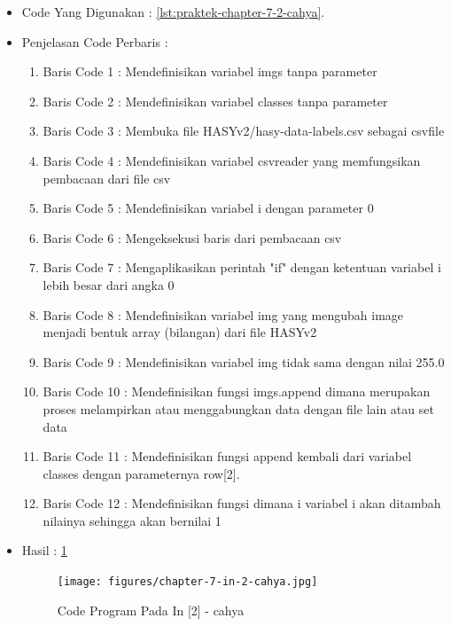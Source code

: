 \begin{enumerate}
\begin{itemize}
\item Code Yang Digunakan : \ref{lst:praktek-chapter-7-2-cahya}.

\par
\par
\item Penjelasan Code Perbaris	: 
\begin{enumerate}
\item Baris Code 1	: Mendefinisikan variabel imgs tanpa parameter
\item Baris Code 2	: Mendefinisikan variabel classes tanpa parameter
\item Baris Code 3	: Membuka file HASYv2/hasy-data-labels.csv sebagai csvfile
\item Baris Code 4	: Mendefinisikan variabel csvreader yang memfungsikan pembacaan dari file csv
\item Baris Code 5	: Mendefinisikan variabel i dengan parameter 0
\item Baris Code 6	: Mengeksekusi baris dari pembacaan csv 
\item Baris Code 7	: Mengaplikasikan perintah "if" dengan ketentuan variabel i lebih besar dari angka 0
\item Baris Code 8	: Mendefinisikan variabel img yang mengubah image menjadi bentuk array (bilangan) dari file HASYv2
\item Baris Code 9	: Mendefinisikan variabel img tidak sama dengan nilai 255.0
\item Baris Code 10	: Mendefinisikan fungsi imgs.append dimana merupakan proses melampirkan atau menggabungkan data dengan file lain atau set data
\item Baris Code 11	: Mendefinisikan fungsi append kembali dari variabel classes dengan parameternya row[2].
\item Baris Code 12	: Mendefinisikan fungsi dimana i variabel i akan ditambah nilainya sehingga akan bernilai 1
\end{enumerate}
\par
\item Hasil : \ref{chapter-7-in-2-cahya}
\par
\par
\begin{figure}[!hbtp]
\centering
\texttt{[image: figures/chapter-7-in-2-cahya.jpg]}
\caption{Code Program Pada In [2] - cahya}
\label{chapter-7-in-2-cahya}

\end{figure}
\end{itemize}
\end{enumerate}
